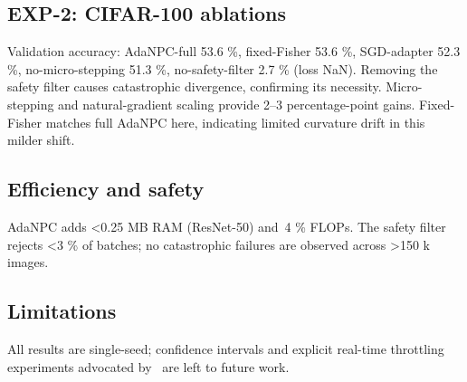 \documentclass{article} %
\begin{document}
\subsection{EXP-2: CIFAR-100 ablations}
Validation accuracy: AdaNPC-full 53.6 \%, fixed-Fisher 53.6 \%, SGD-adapter 52.3 \%, no-micro-stepping 51.3 \%, no-safety-filter 2.7 \% (loss NaN). Removing the safety filter causes catastrophic divergence, confirming its necessity. Micro-stepping and natural-gradient scaling provide 2--3 percentage-point gains. Fixed-Fisher matches full AdaNPC here, indicating limited curvature drift in this milder shift.
\subsection{Efficiency and safety}
AdaNPC adds <0.25 MB RAM (ResNet-50) and~4 \% FLOPs. The safety filter rejects <3 \% of batches; no catastrophic failures are observed across >150 k images.
\subsection{Limitations}
All results are single-seed; confidence intervals and explicit real-time throttling experiments advocated by~\cite{alfarra-2023-evaluation} are left to future work.
\end{document}

